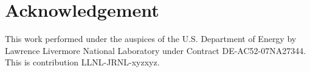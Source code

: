 \section*{Acknowledgement}

This work performed under the auspices of the U.S. Department of Energy by Lawrence Livermore National Laboratory under Contract DE-AC52-07NA27344. This is contribution LLNL-JRNL-xyzxyz.